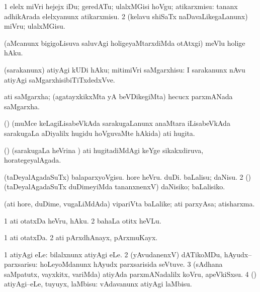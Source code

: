 \bentry
{}
\gl{\sakirx}
\bmng
\bnum
\num{1} elelx miVri hejejx iDu; geredATu; ulalxMGisi hoVgu; atikarxmisu:  tananx adhikArada elelxyanunx atikarxmisu. 
\num{2} (kelavu shiSaTx naDavaLikegaLanunx) miVru; ulalxMGisu. 
\enum
\emng
\eentry


\bentry
{}
\gl{\sakirx}
\bmng
(aMcanunx bigigoLisuva saluvAgi holigeyaMtarxdiMda otAtxgi) meVlu holige hAku. 
\emng
\eentry


\bentry
{}
\gl{\sakirx}
\bmng
(sarakanunx) atiyAgi kUDi hAku; mitimiVri saMgarxhisu:  I sarakanunx nAvu atiyAgi saMgarxhisibiTiTxdedxVve. 
\emng
\eentry


\bentry
{}
\gl{\nA}
\bmng
ati saMgarxha; (agatayxkikxMta yA beVDikegiMta) hecucx parxmANada saMgarxha. 
\emng
\eentry


\bentry
{}
\gl{\nA}
\bmng
(\nw) (muMce keLagiLisabeVkAda sarakugaLanunx anaMtara iLisabeVkAda sarakugaLa aDiyalilx hugidu hoVguvaMte hAkida) ati hugita. 
\emng
\eentry


\bentry
{}
\gl{\gu}
\bmng
(\nw) (sarakugaLa heVrina \vi) ati hugitadiMdAgi keYge sikakxdiruva, horategeyalAgada. 
\emng
\eentry


\bentry
{}
\gl{\sakirx}
\bmng
\bnum
{} (taDeyalAgadaSuTx) 
\banum
{} balaparxyoVgisu. 
 hore heVru. 
 duDi. 
 baLalisu; daNisu. 
\eanum
\numie
\num{2} (\AtAmx) (taDeyalAgadaSuTx duDimeyiMda tananxnenxV) daNisiko; baLalisiko. 
\enum
\emng
\eentry


\bentry
{}
\gl{\nA}
\bmng
(ati hore, duDime, \mo vugaLiMdAda) vipariVta baLalike; ati parxyAsa; atisharxma. 
\emng
\eentry

\bentry
{}
\gl{\sakirx}
\bmng
\bnum
\num{1} ati otatxDa heVru, hAku. 
\num{2} bahaLa otitx heVLu. 
\enum
\emng
\eentry

\bentry
{}
\gl{\nA}
\bmng
\bnum
\num{1} ati otatxDa. 
\num{2} ati pArxdhAnayx, pArxmuKayx. 
\enum
\emng
\eentry

\bentry
{}
\gl{\sakirx}
\bmng
\bnum
\num{1} atiyAgi eLe:  bilalxnunx atiyAgi eLe. 
\num{2} (yAvudanenxV) dATikoMDu, hAyudx--parxsarisu:  hoLeyoMdanunx hAyudx parxsarisida seVtuve. 
\num{3} (sAdhana saMpatutx, vayxkitx, \mo variMda) atiyAda parxmANadalilx koVru, apeVkiSxsu. 
\num{4} (\rUpa) atiyAgi--eLe, tuyuyx, laMbisu:  vAdavanunx atiyAgi laMbisu. 
\enum
\emng
\eentry

